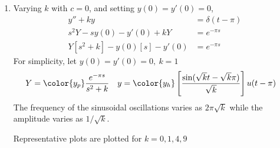 \begin{enumerate}
\begin{enumerate}
              \item Varying $ k $ with $ c = 0 $, and setting $ y(0) = y'(0) = 0 $,
                    \begin{align}
                        y'' + ky                     & = \delta(t - \pi) \\
                        s^2Y - sy(0) - y'(0) + kY    & = e^{-\pi s}      \\
                        Y[s^2 + k] - y(0)[s] - y'(0) & = e^{-\pi s}
                    \end{align}
                    For simplicity, let $ y(0) = y'(0) = 0,\ k = 1 $
                    \begin{align}
                        Y         & = \color{y_p} \frac{e^{-\pi s}}
                        {s^2 + k} &
                        y         & = \color{y_h}
                        \left[ \frac{\sin(\sqrt{k}t - \sqrt{k}\pi)}
                            {\sqrt{k}} \right] u(t - \pi)
                    \end{align}
                    The frequency of the sinusoidal oscillations varies as
                    $ 2\pi\sqrt{k} $ while the amplitude varies as $ 1/\sqrt{k} $.
                    \par Representative plots are plotted for $ k = 0,1,4,9 $
                    \begin{figure}[H]
                        \centering
\end{figure}
\end{enumerate}
\end{enumerate}
